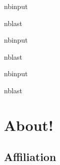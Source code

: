 \documentclass[letterpaper,10pt,english]{sphinxmanual}
\begin{document}
\begin{sphinxuseclass}{nbinput}
\begin{sphinxuseclass}{nblast}
{
\begin{sphinxVerbatim}[commandchars=\\\{\}]
\llap{\color{nbsphinxin}[ ]:\,\hspace{\fboxrule}\hspace{\fboxsep}}
\end{sphinxVerbatim}
}

\end{sphinxuseclass}
\end{sphinxuseclass}
\begin{sphinxuseclass}{nbinput}
\begin{sphinxuseclass}{nblast}
{
\begin{sphinxVerbatim}[commandchars=\\\{\}]
\llap{\color{nbsphinxin}[ ]:\,\hspace{\fboxrule}\hspace{\fboxsep}}
\end{sphinxVerbatim}
}

\end{sphinxuseclass}
\end{sphinxuseclass}
\begin{sphinxuseclass}{nbinput}
\begin{sphinxuseclass}{nblast}
{
\begin{sphinxVerbatim}[commandchars=\\\{\}]
\llap{\color{nbsphinxin}[ ]:\,\hspace{\fboxrule}\hspace{\fboxsep}}
\end{sphinxVerbatim}
}

\end{sphinxuseclass}
\end{sphinxuseclass}

\chapter{About!}
\label{\detokenize{index:about}}
\sphinxstepscope


\section{Affiliation}
\label{\detokenize{aboutMe:affiliation}}\label{\detokenize{aboutMe::doc}}

\begin{quote}


\end{quote}
\end{document}
